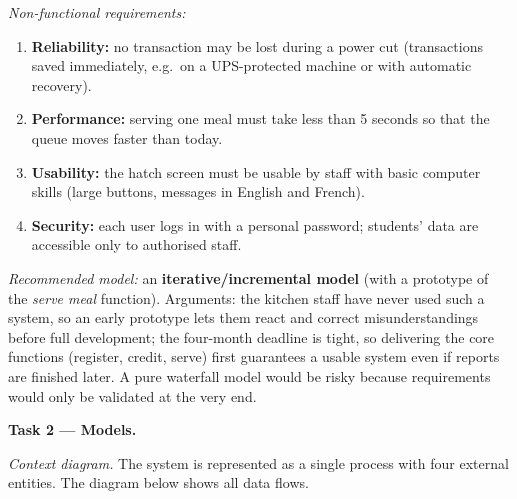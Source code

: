 \documentclass[11pt]{article}
\begin{document}
\emph{Non-functional requirements:}
\begin{enumerate}
\item \textbf{Reliability:} no transaction may be lost during a power cut (transactions saved immediately, e.g.\ on a UPS-protected machine or with automatic recovery).
\item \textbf{Performance:} serving one meal must take less than 5 seconds so that the queue moves faster than today.
\item \textbf{Usability:} the hatch screen must be usable by staff with basic computer skills (large buttons, messages in English and French).
\item \textbf{Security:} each user logs in with a personal password; students' data are accessible only to authorised staff.
\end{enumerate}

\emph{Recommended model:} an \textbf{iterative/incremental model} (with a prototype of the \emph{serve meal} function). Arguments: the kitchen staff have never used such a system, so an early prototype lets them react and correct misunderstandings before full development; the four-month deadline is tight, so delivering the core functions (register, credit, serve) first guarantees a usable system even if reports are finished later. A pure waterfall model would be risky because requirements would only be validated at the very end.

\textbf{Task 2 — Models.}

\emph{Context diagram.} The system is represented as a single process with four external entities. The diagram below shows all data flows.
\end{document}
